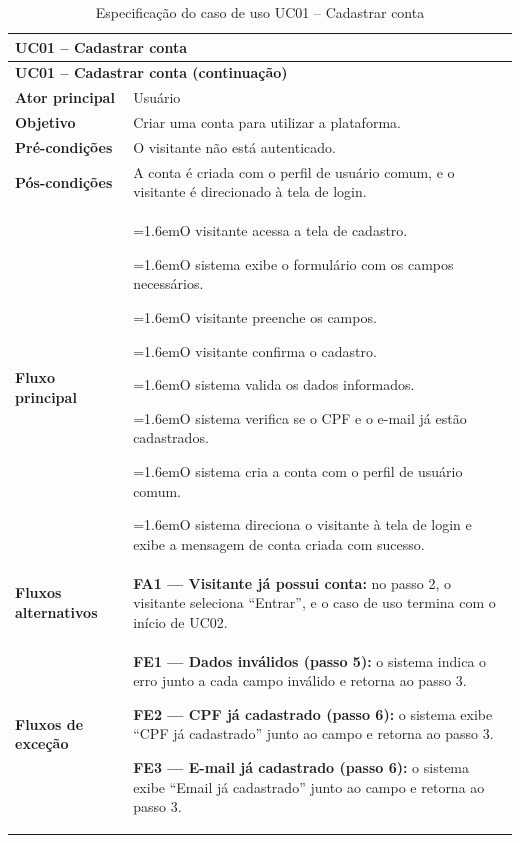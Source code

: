 \documentclass[12pt,a4paper]{article}
\newcommand{\ucitem}[2]{\par\noindent\hangindent=1.6em\hangafter=1\makebox[1.6em][l]{#1}#2}
\begin{document}
\begin{longtable}{|p{}|p{}|}
\caption{Especificação do caso de uso UC01 -- Cadastrar conta}
\label{tab:uc01} \\
\hline
\multicolumn{2}{|l|}{\textbf{UC01 -- Cadastrar conta}} \\
\hline
\endfirsthead

\hline
\multicolumn{2}{|l|}{\textbf{UC01 -- Cadastrar conta (continuação)}} \\
\hline
\endhead

\hline
\endfoot
\textbf{Ator principal} & Usuário \\ \hline
\textbf{Objetivo} & Criar uma conta para utilizar a plataforma. \\ \hline
\textbf{Pré-condições} & O visitante não está autenticado. \\ \hline
\textbf{Pós-condições} & A conta é criada com o perfil de usuário comum, e o visitante é direcionado à tela de login. \\ \hline
\textbf{Fluxo principal} &
\ucitem{1.}{O visitante acessa a tela de cadastro.}
\ucitem{2.}{O sistema exibe o formulário com os campos necessários.}
\ucitem{3.}{O visitante preenche os campos.}
\ucitem{4.}{O visitante confirma o cadastro.}
\ucitem{5.}{O sistema valida os dados informados.}
\ucitem{6.}{O sistema verifica se o CPF e o e-mail já estão cadastrados.}
\ucitem{7.}{O sistema cria a conta com o perfil de usuário comum.}
\ucitem{8.}{O sistema direciona o visitante à tela de login e exibe a mensagem de conta criada com sucesso.} \\ \hline
\textbf{Fluxos alternativos} &
\noindent \textbf{FA1 — Visitante já possui conta:} no passo 2, o visitante seleciona ``Entrar'', e o caso de uso termina com o início de UC02. \\ \hline
\textbf{Fluxos de exceção} &
\noindent \textbf{FE1 — Dados inválidos (passo 5):} o sistema indica o erro junto a cada campo inválido e retorna ao passo 3.
\par\smallskip\noindent \textbf{FE2 — CPF já cadastrado (passo 6):} o sistema exibe ``CPF já cadastrado'' junto ao campo e retorna ao passo 3.
\par\smallskip\noindent \textbf{FE3 — E-mail já cadastrado (passo 6):} o sistema exibe ``Email já cadastrado'' junto ao campo e retorna ao passo 3. \\
\end{longtable}
\end{document}

